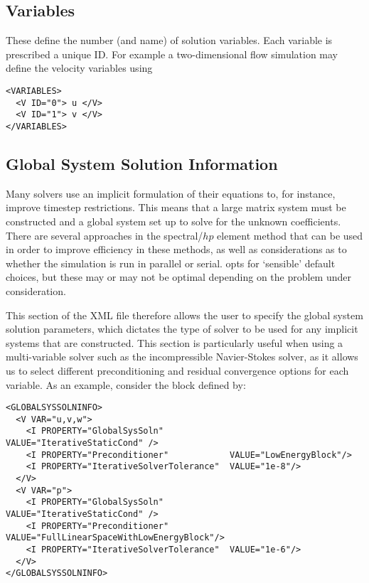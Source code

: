 \subsection{Variables}

These define the number (and name) of solution variables. Each variable is
prescribed a unique ID. For example a two-dimensional flow simulation may define
the velocity variables using

\begin{lstlisting}[style=XMLStyle]
<VARIABLES>
  <V ID="0"> u </V>
  <V ID="1"> v </V>
</VARIABLES>
\end{lstlisting}

\subsection{Global System Solution Information}

Many \nekpp solvers use an implicit formulation of their equations to, for
instance, improve timestep restrictions. This means that a large matrix system
must be constructed and a global system set up to solve for the unknown
coefficients. There are several approaches in the spectral/$hp$ element method
that can be used in order to improve efficiency in these methods, as well as
considerations as to whether the simulation is run in parallel or serial. \nekpp
opts for `sensible' default choices, but these may or may not be optimal
depending on the problem under consideration.

This section of the XML file therefore allows the user to specify the global
system solution parameters, which dictates the type of solver to be used for any
implicit systems that are constructed. This section is particularly useful when
using a multi-variable solver such as the incompressible Navier-Stokes solver,
as it allows us to select different preconditioning and residual convergence
options for each variable. As an example, consider the block defined by:

\begin{lstlisting}[style=XMLStyle]
<GLOBALSYSSOLNINFO>
  <V VAR="u,v,w">
    <I PROPERTY="GlobalSysSoln"             VALUE="IterativeStaticCond" />
    <I PROPERTY="Preconditioner"            VALUE="LowEnergyBlock"/>
    <I PROPERTY="IterativeSolverTolerance"  VALUE="1e-8"/>
  </V>
  <V VAR="p">
    <I PROPERTY="GlobalSysSoln"             VALUE="IterativeStaticCond" />
    <I PROPERTY="Preconditioner"     VALUE="FullLinearSpaceWithLowEnergyBlock"/>
    <I PROPERTY="IterativeSolverTolerance"  VALUE="1e-6"/>
  </V>
</GLOBALSYSSOLNINFO>
\end{lstlisting}


